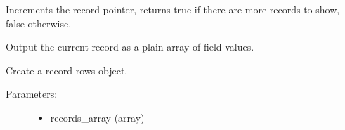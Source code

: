 \documentclass[letterpaper,10pt,english]{sphinxmanual}
\begin{document}
\begin{fulllineitems}

\begin{fulllineitems}
\label{knop_database:knop_databaserows.field_names_map}
\end{fulllineitems}



\begin{fulllineitems}
\end{fulllineitems}


\begin{fulllineitems}
\label{knop_database:knop_databaserows.get}
\end{fulllineitems}


\begin{fulllineitems}
\label{knop_database:knop_databaserows.next}
Increments the record pointer, returns true if there are more records to show, false otherwise.

\end{fulllineitems}


\begin{fulllineitems}
\label{knop_database:knop_databaserows.onconvert}
Output the current record as a plain array of field values.

\end{fulllineitems}


\begin{fulllineitems}
\label{knop_database:knop_databaserows.oncreate}
Create a record rows object.
\begin{description}
\item[{Parameters:}] \leavevmode\begin{itemize}
\item {} 
records\_array (array)
\begin{quote}


\end{quote}
\end{itemize}
\end{description}
\end{fulllineitems}
\end{fulllineitems}
\end{document}
